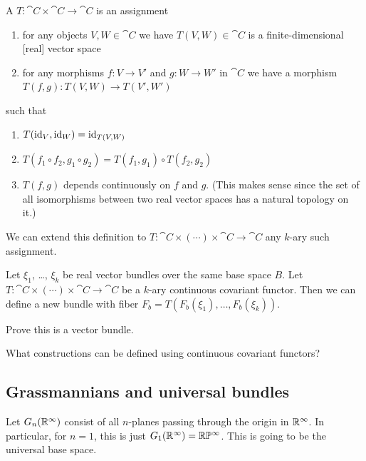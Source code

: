 \begin{definition}
A  $T\colon\cat{C}\times\cat{C}\to\cat{C}$
is an assignment
\begin{enumerate}
\item for any objects $V,W\in\cat{C}$ we have $T(V,W)\in\cat{C}$ is a
  finite-dimensional [real] vector space
\item for any morphisms $f\colon V\to V'$ and $g\colon W\to W'$ in $\cat{C}$
we have a morphism $T(f,g)\colon T(V,W)\to T(V',W')$
\end{enumerate}
such that
\begin{enumerate}
\item $T(\operatorname{id}_{V},\operatorname{id}_{W})=\operatorname{id}_{T(V,W)}$
\item $T(f_{1}\circ f_{2},g_{1}\circ g_{2})=T(f_{1},g_{1})\circ T(f_{2},g_{2})$
\item $T(f,g)$ depends continuously on $f$ and $g$. (This makes sense
  since the set of all isomorphisms between two real vector spaces has
  a natural topology on it.)
\end{enumerate}
We can extend this definition to $T\colon\cat{C}\times(\cdots)\times\cat{C}\to\cat{C}$
any $k$-ary such assignment.
\end{definition}

\begin{theorem}
Let $\xi_{1}$, \dots, $\xi_{k}$ be real vector bundles over the same
base space $B$. Let $T\colon\cat{C}\times(\cdots)\times\cat{C}\to\cat{C}$
be a $k$-ary continuous covariant functor. Then we can define a new
bundle with fiber $F_{b}=T(F_{b}(\xi_{1}),\dots,F_{b}(\xi_{k}))$.
\end{theorem}

\begin{xca}
Prove this is a vector bundle.
\end{xca}

\begin{xca}
What constructions can be defined using continuous covariant functors?
\end{xca}

\subsection{Grassmannians and universal bundles}

\begin{node}
Let $G_{n}(\mathbb{R}^{\infty})$ consist of all $n$-planes passing through
the origin in $\mathbb{R}^{\infty}$. In particular, for $n=1$, this is just
$G_{1}(\mathbb{R}^{\infty})=\mathbb{R}\mathbb{P}^{\infty}$. This is going to be the universal
base space.
\end{node}


